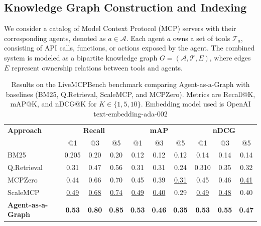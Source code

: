\documentclass[a4paper,twoside]{article}
\begin{document}
\subsection{Knowledge Graph Construction and Indexing}\label{subsec:kg-construction}

We consider a catalog of Model Context Protocol (MCP) servers with their corresponding agents, denoted as \(a \in \mathcal{A}\). Each agent \(a\) owns a set of tools \(\mathcal{T}_a\), consisting of API calls, functions, or actions exposed by the agent. The combined system is modeled as a bipartite knowledge graph \(G = (\mathcal{A}, \mathcal{T}, E)\), where edges \(E\) represent ownership relations between tools and agents.

\begin{table}[t]
\caption{Results on the LiveMCPBench benchmark comparing Agent-as-a-Graph with baselines (BM25, Q.Retrieval, ScaleMCP, and MCPZero). 
Metrics are Recall@K, mAP@K, and nDCG@K for $K \in \{1, 5, 10\}$. Embedding model used is OpenAI text-embedding-ada-002}
\label{tab:results_primary}
\centering
\begingroup
\small %
\setlength{\tabcolsep}{3pt} %
\renewcommand{\arraystretch}{1.05} %
\begin{tabular}{l|ccc|ccc|ccc}
\hline
\textbf{Approach} & \multicolumn{3}{c|}{\textbf{Recall}} & \multicolumn{3}{c|}{\textbf{mAP}} & \multicolumn{3}{c}{\textbf{nDCG}} \\
 & @1 & @3 & @5 & @1 & @3 & @5 & @1 & @3 & @5 \\
\hline
BM25 & 0.205 & 0.20 & 0.20 & 0.12 & 0.12 & 0.12 & 0.14 & 0.14 & 0.14 \\
Q.Retrieval & 0.31 & 0.47 & 0.56 & 0.31 & 0.31 & 0.24 & 0.310 & 0.35 & 0.32 \\
MCPZero & 0.44 & 0.66 & 0.70 & 0.45 & 0.39 & \underline{0.31} & 0.45 & 0.46 & \underline{0.41} \\
ScaleMCP & \underline{0.49} & \underline{0.68} & \underline{0.74} & \underline{0.49} & \underline{0.40} & 0.29 & \underline{0.49} & \underline{0.48} & 0.40 \\
\textbf{Agent-as-a-Graph} & \textbf{0.53} & \textbf{0.80} & \textbf{0.85} & \textbf{0.53} & \textbf{0.46} & \textbf{0.35} & \textbf{0.53} & \textbf{0.55} & \textbf{0.47} \\
\hline
\end{tabular}
\endgroup
\end{table}
\end{document}
